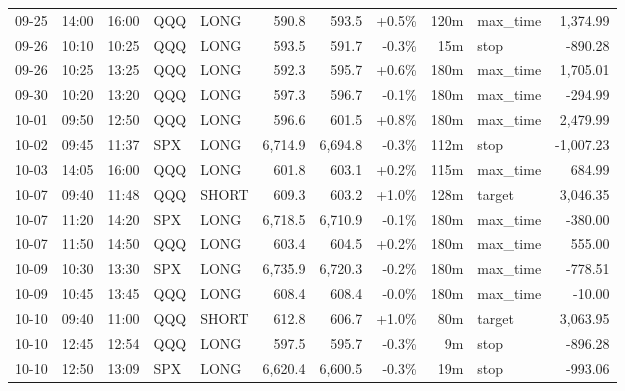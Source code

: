 \documentclass[11pt,a4paper,twoside]{article}
\begin{document}
\begin{center}
\begin{longtable}{>{\color{txtmain}}l l l l l r r r r >{\color{txtmain}}l r}
09-25 & 14:00 & 16:00 & QQQ & LONG & 590.8 & 593.5 & \textcolor{wingreen}{+0.5\%} & 120m & max\_time & \textcolor{wingreen}{1,374.99} \\
09-26 & 10:10 & 10:25 & QQQ & LONG & 593.5 & 591.7 & \textcolor{lossred}{-0.3\%} & 15m & stop & \textcolor{lossred}{-890.28} \\
09-26 & 10:25 & 13:25 & QQQ & LONG & 592.3 & 595.7 & \textcolor{wingreen}{+0.6\%} & 180m & max\_time & \textcolor{wingreen}{1,705.01} \\
09-30 & 10:20 & 13:20 & QQQ & LONG & 597.3 & 596.7 & \textcolor{lossred}{-0.1\%} & 180m & max\_time & \textcolor{lossred}{-294.99} \\
10-01 & 09:50 & 12:50 & QQQ & LONG & 596.6 & 601.5 & \textcolor{wingreen}{+0.8\%} & 180m & max\_time & \textcolor{wingreen}{2,479.99} \\
10-02 & 09:45 & 11:37 & SPX & LONG & 6,714.9 & 6,694.8 & \textcolor{lossred}{-0.3\%} & 112m & stop & \textcolor{lossred}{-1,007.23} \\
10-03 & 14:05 & 16:00 & QQQ & LONG & 601.8 & 603.1 & \textcolor{wingreen}{+0.2\%} & 115m & max\_time & \textcolor{wingreen}{684.99} \\
10-07 & 09:40 & 11:48 & QQQ & SHORT & 609.3 & 603.2 & \textcolor{wingreen}{+1.0\%} & 128m & target & \textcolor{wingreen}{3,046.35} \\
10-07 & 11:20 & 14:20 & SPX & LONG & 6,718.5 & 6,710.9 & \textcolor{lossred}{-0.1\%} & 180m & max\_time & \textcolor{lossred}{-380.00} \\
10-07 & 11:50 & 14:50 & QQQ & LONG & 603.4 & 604.5 & \textcolor{wingreen}{+0.2\%} & 180m & max\_time & \textcolor{wingreen}{555.00} \\
10-09 & 10:30 & 13:30 & SPX & LONG & 6,735.9 & 6,720.3 & \textcolor{lossred}{-0.2\%} & 180m & max\_time & \textcolor{lossred}{-778.51} \\
10-09 & 10:45 & 13:45 & QQQ & LONG & 608.4 & 608.4 & \textcolor{lossred}{-0.0\%} & 180m & max\_time & \textcolor{lossred}{-10.00} \\
10-10 & 09:40 & 11:00 & QQQ & SHORT & 612.8 & 606.7 & \textcolor{wingreen}{+1.0\%} & 80m & target & \textcolor{wingreen}{3,063.95} \\
10-10 & 12:45 & 12:54 & QQQ & LONG & 597.5 & 595.7 & \textcolor{lossred}{-0.3\%} & 9m & stop & \textcolor{lossred}{-896.28} \\
10-10 & 12:50 & 13:09 & SPX & LONG & 6,620.4 & 6,600.5 & \textcolor{lossred}{-0.3\%} & 19m & stop & \textcolor{lossred}{-993.06} \\

\end{longtable}
\end{center}
\end{document}
